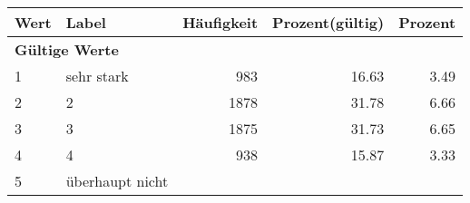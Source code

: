      \begin{longtable}{lXrrr}
     \toprule
     \textbf{Wert} & \textbf{Label} & \textbf{Häufigkeit} & \textbf{Prozent(gültig)} & \textbf{Prozent} \\
     \endhead
     \midrule
     \multicolumn{5}{l}{\textbf{Gültige Werte}}\\

     1 &
     \multicolumn{1}{X}{ sehr stark   } &


       \num{983} &
       \num[round-mode=places,round-precision=2]{16.63} &
         \num[round-mode=places,round-precision=2]{3.49} \\

     2 &
     \multicolumn{1}{X}{ 2   } &


       \num{1878} &
       \num[round-mode=places,round-precision=2]{31.78} &
         \num[round-mode=places,round-precision=2]{6.66} \\

     3 &
     \multicolumn{1}{X}{ 3   } &


       \num{1875} &
       \num[round-mode=places,round-precision=2]{31.73} &
         \num[round-mode=places,round-precision=2]{6.65} \\

     4 &
     \multicolumn{1}{X}{ 4   } &


       \num{938} &
       \num[round-mode=places,round-precision=2]{15.87} &
         \num[round-mode=places,round-precision=2]{3.33} \\

     5 &
     \multicolumn{1}{X}{ überhaupt nicht   } &



\end{longtable}

